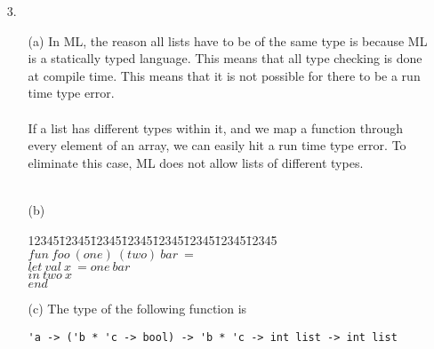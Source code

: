\documentclass[11pt]{article}
\newenvironment{code}{\begin{tabbing}
12345\=12345\=12345\=12345\=12345\=12345\=12345\=12345\= \kill }
{\end{tabbing}}
\begin{document}
\begin{enumerate}
\item[3. ]
\begin{itemize}
\item[(a)]
In ML, the reason all lists have to be of the same type is because ML is a statically typed language.  This means that all type checking is done at compile time.  This means that it is not possible for there to be a run time type error.  \\ \\
If a list has different types within it, and we map a function through every element of an array, we can easily hit a run time type error.  To eliminate this case, ML does not allow lists of different types.\\ \\
\item[(b)] 
\begin{code}
$fun\ foo\ (one)\ (two)\ bar\ = $\\
\> $let\ val\ x\ = one\ bar$\\
\> $in\ two\ x$ \\
\> $end$\\ 
\end{code}
\item[(c)] The type of the following function is 
\begin{verbatim}
'a -> ('b * 'c -> bool) -> 'b * 'c -> int list -> int list


\end{verbatim}
\end{itemize}
\end{enumerate}
\end{document}

